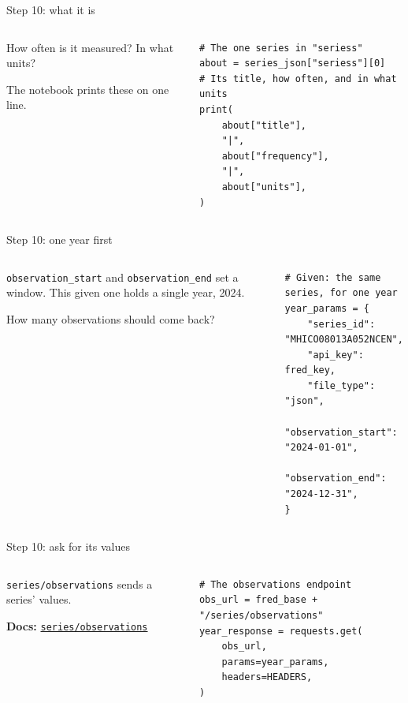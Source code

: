 \documentclass[9pt,aspectratio=169]{beamer}
\begin{document}
\begin{frame}[fragile]{Step 10: what it is}
    \begin{columns}[T]
        \begin{column}{0.37\textwidth}
            How often is it measured? In what units?

            \medskip
            The notebook prints these on one line.
        \end{column}
        \begin{column}{0.6\textwidth}
\begin{lstlisting}
# The one series in "seriess"
about = series_json["seriess"][0]
# Its title, how often, and in what units
print(
    about["title"],
    "|",
    about["frequency"],
    "|",
    about["units"],
)
\end{lstlisting}
        \end{column}
    \end{columns}
\end{frame}

\begin{frame}[fragile]{Step 10: one year first}
    \begin{columns}[T]
        \begin{column}{0.37\textwidth}
            \texttt{observation\_start} and \texttt{observation\_end} set a window. This given one holds a single year, 2024.

            \medskip
            How many observations should come back?
        \end{column}
        \begin{column}{0.6\textwidth}
\begin{lstlisting}
# Given: the same series, for one year
year_params = {
    "series_id": "MHICO08013A052NCEN",
    "api_key": fred_key,
    "file_type": "json",
    "observation_start": "2024-01-01",
    "observation_end": "2024-12-31",
}
\end{lstlisting}
        \end{column}
    \end{columns}
\end{frame}

\begin{frame}[fragile]{Step 10: ask for its values}
    \begin{columns}[T]
        \begin{column}{0.37\textwidth}
            \texttt{series/observations} sends a series' values.

            \medskip
            {\scriptsize\textbf{Docs:} \href{https://fred.stlouisfed.org/docs/api/fred/series_observations.html}{\texttt{series/observations}}\par}
        \end{column}
        \begin{column}{0.6\textwidth}
\begin{lstlisting}
# The observations endpoint
obs_url = fred_base + "/series/observations"
year_response = requests.get(
    obs_url,
    params=year_params,
    headers=HEADERS,
)
\end{lstlisting}
        \end{column}
    \end{columns}
\end{frame}
\end{document}
